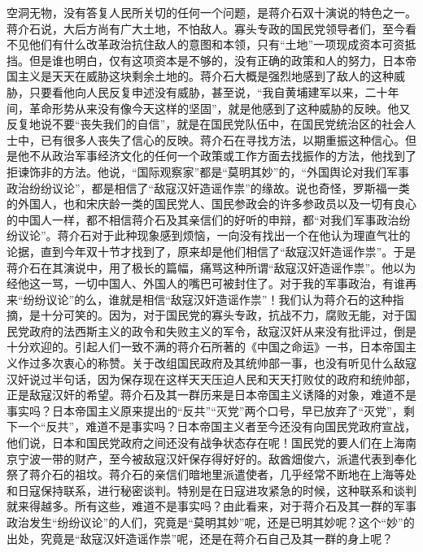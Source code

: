 \documentclass[cn,11pt,chinese]{elegantbook}
\begin{document}
空洞无物，没有答复人民所关切的任何一个问题，是蒋介石双十演说的特色之一。蒋介石说，大后方尚有广大土地，不怕敌人。寡头专政的国民党领导者们，至今看不见他们有什么改革政治抗住敌人的意图和本领，只有“土地”一项现成资本可资抵挡。但是谁也明白，仅有这项资本是不够的，没有正确的政策和人的努力，日本帝国主义是天天在威胁这块剩余土地的。蒋介石大概是强烈地感到了敌人的这种威胁，只要看他向人民反复申述没有威胁，甚至说，“我自黄埔建军以来，二十年间，革命形势从来没有像今天这样的坚固”，就是他感到了这种威胁的反映。他又反复地说不要“丧失我们的自信”，就是在国民党队伍中，在国民党统治区的社会人士中，已有很多人丧失了信心的反映。蒋介石在寻找方法，以期重振这种信心。但是他不从政治军事经济文化的任何一个政策或工作方面去找振作的方法，他找到了拒谏饰非的方法。他说，“国际观察家”都是“莫明其妙”的，“外国舆论对我们军事政治纷纷议论”，都是相信了“敌寇汉奸造谣作祟”的缘故。说也奇怪，罗斯福一类的外国人，也和宋庆龄一类的国民党人、国民参政会的许多参政员以及一切有良心的中国人一样，都不相信蒋介石及其亲信们的好听的申辩，都“对我们军事政治纷纷议论”。蒋介石对于此种现象感到烦恼，一向没有找出一个在他认为理直气壮的论据，直到今年双十节才找到了，原来却是他们相信了“敌寇汉奸造谣作祟”。于是蒋介石在其演说中，用了极长的篇幅，痛骂这种所谓“敌寇汉奸造谣作祟”。他以为经他这一骂，一切中国人、外国人的嘴巴可被封住了。对于我的军事政治，有谁再来“纷纷议论”的么，谁就是相信“敌寇汉奸造谣作祟”！我们认为蒋介石的这种指摘，是十分可笑的。因为，对于国民党的寡头专政，抗战不力，腐败无能，对于国民党政府的法西斯主义的政令和失败主义的军令，敌寇汉奸从来没有批评过，倒是十分欢迎的。引起人们一致不满的蒋介石所著的《中国之命运》一书，日本帝国主义作过多次衷心的称赞。关于改组国民政府及其统帅部一事，也没有听见什么敌寇汉奸说过半句话，因为保存现在这样天天压迫人民和天天打败仗的政府和统帅部，正是敌寇汉奸的希望。蒋介石及其一群历来是日本帝国主义诱降的对象，难道不是事实吗？日本帝国主义原来提出的“反共”“灭党”两个口号，早已放弃了“灭党”，剩下一个“反共”，难道不是事实吗？日本帝国主义者至今还没有向国民党政府宣战，他们说，日本和国民党政府之间还没有战争状态存在呢！国民党的要人们在上海南京宁波一带的财产，至今被敌寇汉奸保存得好好的。敌酋畑俊六，派遣代表到奉化祭了蒋介石的祖坟。蒋介石的亲信们暗地里派遣使者，几乎经常不断地在上海等处和日寇保持联系，进行秘密谈判。特别是在日寇进攻紧急的时候，这种联系和谈判就来得越多。所有这些，难道不是事实吗？由此看来，对于蒋介石及其一群的军事政治发生“纷纷议论”的人们，究竟是“莫明其妙”呢，还是已明其妙呢？这个“妙”的出处，究竟是“敌寇汉奸造谣作祟”呢，还是在蒋介石自己及其一群的身上呢？\\
\end{document}
